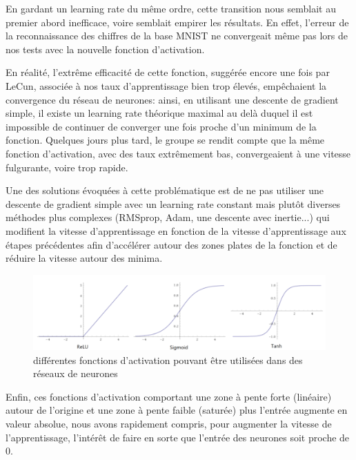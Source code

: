 \documentclass[
    10pt,
    a4paper,
    oneside,
    headinclude,footinclude,
    BCOR=5mm,
    captions=tableabove
]{scrartcl}
\begin{document}
En gardant un learning rate du même ordre, cette transition nous semblait au premier abord inefficace, voire semblait empirer les résultats. En effet, l'erreur de la reconnaissance des chiffres de la base MNIST ne convergeait même pas lors de nos tests avec la nouvelle fonction d'activation. 

En réalité, l'extrême efficacité de cette fonction, suggérée encore une fois par LeCun, associée à nos taux d'apprentissage bien trop élevés, empêchaient la convergence du réseau de neurones: ainsi, en utilisant une descente de gradient simple, il existe un learning rate théorique maximal au delà duquel il est impossible de continuer de converger une fois proche d'un minimum de la fonction. 
 Quelques jours plus tard, le groupe se rendit compte que la même fonction d'activation, avec des taux extrêmement bas, convergeaient à une vitesse fulgurante, voire trop rapide. %
\vspace{5mm}

Une des solutions évoquées à cette problématique est de ne pas utiliser une descente de gradient simple avec un learning rate constant mais plutôt diverses méthodes plus complexes (RMSprop, Adam, une descente avec inertie...) qui modifient la vitesse d'apprentissage en fonction de la vitesse d'apprentissage aux étapes précédentes afin d'accélérer autour des zones plates de la fonction et de réduire la vitesse autour des minima.

\vspace{5mm}

\begin{figure}[h!]
\includegraphics[width=\linewidth]{activations.PNG}
\centering
 \caption{différentes fonctions d'activation pouvant être utilisées dans des réseaux de neurones }
 \label{fig:activations.PNG}
\end{figure}

Enfin, ces fonctions d'activation comportant une zone à pente forte (linéaire) autour de l'origine et une zone à pente faible (saturée) plus l'entrée augmente en valeur absolue, nous avons rapidement compris, pour augmenter la vitesse de l'apprentissage, l'intérêt de faire en sorte que l'entrée des neurones soit proche de $0$. 
\end{document}
